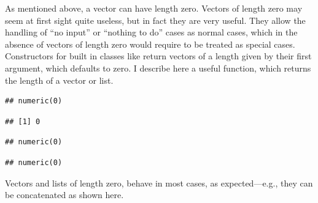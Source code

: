 \documentclass[krantz2]{krantz}\usepackage{knitr}
\begin{document}
\begin{explainbox}
As mentioned above, a vector can have length zero. Vectors of length zero may seem at first sight quite useless, but in fact they are very useful. They allow the handling of ``no input'' or ``nothing to do'' cases as normal cases, which in the absence of vectors of length zero would require to be treated as special cases. Constructors for built in classes like  return vectors of a length given by their first argument, which defaults to zero. I describe here a useful function,  which returns the length of a vector or list.

\begin{knitrout}\footnotesize
{}\color{fgcolor}\begin{kframe}
\begin{alltt}
 \hlkwb{<-} \hlstd{(}\hlstd{)}
\end{alltt}
\begin{verbatim}
## numeric(0)
\end{verbatim}
\begin{alltt}
\end{alltt}
\begin{verbatim}
## [1] 0
\end{verbatim}
\end{kframe}
\end{knitrout}

\begin{knitrout}\footnotesize
{}\color{fgcolor}\begin{kframe}
\begin{alltt}
 \hlkwb{<-} \hlstd{()}
\end{alltt}
\begin{verbatim}
## numeric(0)
\end{verbatim}
\begin{alltt}
 \hlkwb{<-} \hlstd{(} \hlstd{=} \hlstd{)}
\end{alltt}
\begin{verbatim}
## numeric(0)
\end{verbatim}
\end{kframe}
\end{knitrout}

Vectors and lists of length zero, behave in most cases, as expected---e.g., they can be concatenated as shown here.


\end{explainbox}
\end{document}
